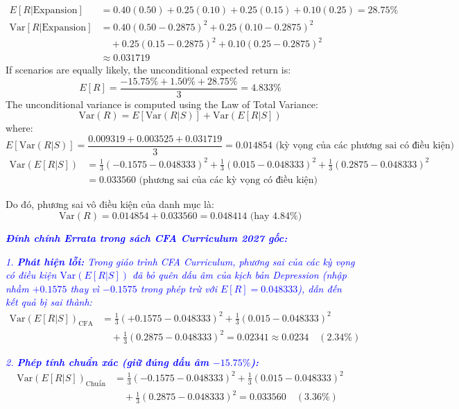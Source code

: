 \begin{tcolorbox}
\begin{align*}
	E[R|\text{Expansion}] &= 0.40(0.50) + 0.25(0.10) + 0.25(0.15) + 0.10(0.25) = 28.75\% \\
	\text{Var}[R|\text{Expansion}] &= 0.40(0.50 - 0.2875)^2 + 0.25(0.10 - 0.2875)^2 \\
	&\quad + 0.25(0.15 - 0.2875)^2 + 0.10(0.25 - 0.2875)^2 \\
	&\approx 0.031719
\end{align*}
If scenarios are equally likely, the unconditional expected return is:
\[ E[R] = \frac{-15.75\% + 1.50\% + 28.75\%}{3} = 4.833\% \]
The unconditional variance is computed using the Law of Total Variance:
\begin{equation}
	\text{Var}(R) = E[\text{Var}(R|S)] + \text{Var}(E[R|S])
	\label{eq:law_of_total_variance_example}
\end{equation}
where:
\[
E[\text{Var}(R|S)] = \frac{0.009319 + 0.003525 + 0.031719}{3} = 0.014854 \text{ (kỳ vọng của các phương sai có điều kiện)}
\]
\begin{align*}
\text{Var}(E[R|S]) &= \frac{1}{3}(-0.1575 - 0.048333)^2 + \frac{1}{3}(0.015 - 0.048333)^2 + \frac{1}{3}(0.2875 - 0.048333)^2 \\
&= 0.033560 \text{ (phương sai của các kỳ vọng có điều kiện)}
\end{align*}

Do đó, phương sai vô điều kiện của danh mục là:
\[ \text{Var}(R) = 0.014854 + 0.033560 = 0.048414 \text{ (hay } 4.84\% \text{)} \]

\vspace{0.5em}
\textcolor{blue}{\textit{\textbf{Đính chính Errata trong sách CFA Curriculum 2027 gốc:}}}

\textcolor{blue}{\textit{1. \textbf{Phát hiện lỗi:} Trong giáo trình CFA Curriculum, phương sai của các kỳ vọng có điều kiện $\text{Var}(E[R|S])$ đã bỏ quên dấu âm của kịch bản Depression (nhập nhầm $\mathbf{+0.1575}$ thay vì $\mathbf{-0.1575}$ trong phép trừ với $E[R] = 0.048333$), dẫn đến kết quả bị sai thành:}}
{\color{blue}
\begin{align*}
\text{Var}(E[R|S])_{\text{CFA}} &= \frac{1}{3}(\mathbf{+0.1575} - 0.048333)^2 + \frac{1}{3}(0.015 - 0.048333)^2 \\
&\quad + \frac{1}{3}(0.2875 - 0.048333)^2 = 0.02341 \approx \mathbf{0.0234} \quad (\mathbf{2.34\%})
\end{align*}
}

\textcolor{blue}{\textit{2. \textbf{Phép tính chuẩn xác (giữ đúng dấu âm $-15.75\%$):}}}
{\color{blue}
\begin{align*}
\text{Var}(E[R|S])_{\text{Chuẩn}} &= \frac{1}{3}(\mathbf{-0.1575} - 0.048333)^2 + \frac{1}{3}(0.015 - 0.048333)^2 \\
&\quad + \frac{1}{3}(0.2875 - 0.048333)^2 = 0.033560 \quad (\mathbf{3.36\%})
\end{align*}
}


\end{tcolorbox}
